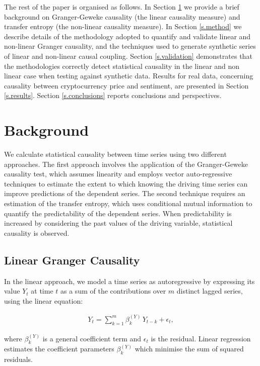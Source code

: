 \documentclass[]{rsos}%
\begin{document}
 The rest of the paper is organised as follows. In Section \ref{s.background} we provide a brief background on Granger-Geweke causality (the linear causality measure) and transfer entropy (the non-linear causality measure). In Section \ref{s.method} we describe details of the methodology adopted to quantify and validate linear and non-linear Granger causality, and the techniques used to generate synthetic series of linear and non-linear causal coupling. Section \ref{s.validation} demonstrates that the methodologies correctly detect statistical causality in the linear and non linear case when testing against synthetic data. Results for real data, concerning causality between cryptocurrency price and sentiment, are presented in Section \ref{s.results}. Section \ref{s.conclusions} reports conclusions and perspectives.


\section{Background} \label{s.background}  

  We calculate statistical causality between time series using two different approaches. The first approach involves the application of the Granger-Geweke causality test, which assumes linearity and employs vector auto-regressive techniques to estimate the extent to which knowing the driving time series can improve predictions of the dependent series. The second technique requires an estimation of the transfer entropy, which uses conditional mutual information to quantify the predictability of the dependent series. When predictability is increased by considering the past values of the driving variable, statistical causality is observed.
  
  \subsection{Linear Granger Causality}
  
  In the linear approach, we model a time series as autoregressive by expressing its value $Y_t$ at time $t$ as a sum of the contributions over $m$ distinct lagged series, using the linear equation:

  \begin{eqnarray}
    \label{eq:autoregression1}
    Y_t = \sum_{k=1}^m \beta_{k}^{(Y)} \, Y_{t-k} + \epsilon_t ,
  \end{eqnarray}

  where $\beta^{(Y)}_k$ is a general coefficient term and $\epsilon_t$ is the residual. Linear regression estimates the coefficient parameters $\beta^{(Y)}_k$ which minimise the sum of squared residuals. 
\end{document}
